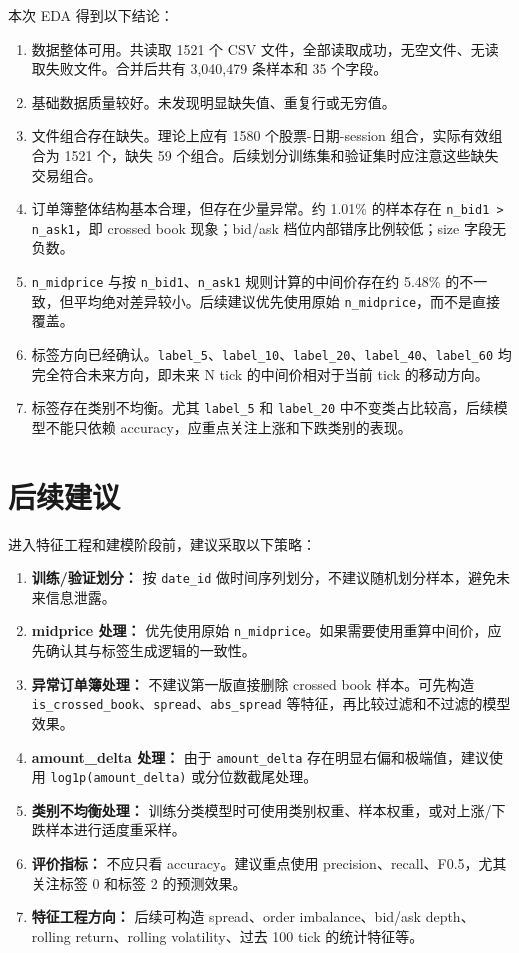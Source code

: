 \documentclass[UTF8,a4paper,12pt]{ctexart}
\begin{document}
本次 EDA 得到以下结论：

\begin{enumerate}
    \item 数据整体可用。共读取 1521 个 CSV 文件，全部读取成功，无空文件、无读取失败文件。合并后共有 3,040,479 条样本和 35 个字段。
    \item 基础数据质量较好。未发现明显缺失值、重复行或无穷值。
    \item 文件组合存在缺失。理论上应有 1580 个股票-日期-session 组合，实际有效组合为 1521 个，缺失 59 个组合。后续划分训练集和验证集时应注意这些缺失交易组合。
    \item 订单簿整体结构基本合理，但存在少量异常。约 1.01\% 的样本存在 \texttt{n\_bid1 > n\_ask1}，即 crossed book 现象；bid/ask 档位内部错序比例较低；size 字段无负数。
    \item \texttt{n\_midprice} 与按 \texttt{n\_bid1}、\texttt{n\_ask1} 规则计算的中间价存在约 5.48\% 的不一致，但平均绝对差异较小。后续建议优先使用原始 \texttt{n\_midprice}，而不是直接覆盖。
    \item 标签方向已经确认。\texttt{label\_5}、\texttt{label\_10}、\texttt{label\_20}、\texttt{label\_40}、\texttt{label\_60} 均完全符合未来方向，即未来 N tick 的中间价相对于当前 tick 的移动方向。
    \item 标签存在类别不均衡。尤其 \texttt{label\_5} 和 \texttt{label\_20} 中不变类占比较高，后续模型不能只依赖 accuracy，应重点关注上涨和下跌类别的表现。
\end{enumerate}

\section{后续建议}

进入特征工程和建模阶段前，建议采取以下策略：

\begin{enumerate}
    \item \textbf{训练/验证划分：} 按 \texttt{date\_id} 做时间序列划分，不建议随机划分样本，避免未来信息泄露。
    \item \textbf{midprice 处理：} 优先使用原始 \texttt{n\_midprice}。如果需要使用重算中间价，应先确认其与标签生成逻辑的一致性。
    \item \textbf{异常订单簿处理：} 不建议第一版直接删除 crossed book 样本。可先构造 \texttt{is\_crossed\_book}、\texttt{spread}、\texttt{abs\_spread} 等特征，再比较过滤和不过滤的模型效果。
    \item \textbf{amount\_delta 处理：} 由于 \texttt{amount\_delta} 存在明显右偏和极端值，建议使用 \texttt{log1p(amount\_delta)} 或分位数截尾处理。
    \item \textbf{类别不均衡处理：} 训练分类模型时可使用类别权重、样本权重，或对上涨/下跌样本进行适度重采样。
    \item \textbf{评价指标：} 不应只看 accuracy。建议重点使用 precision、recall、F0.5，尤其关注标签 0 和标签 2 的预测效果。
    \item \textbf{特征工程方向：} 后续可构造 spread、order imbalance、bid/ask depth、rolling return、rolling volatility、过去 100 tick 的统计特征等。
\end{enumerate}
\end{document}
